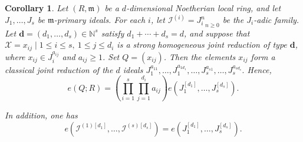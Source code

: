 \documentclass[reqno,12pt]{amsart}
\theoremstyle{plain}
\newtheorem{cor}[prop]{Corollary}
\theoremstyle{definition}
\theoremstyle{remark}
\numberwithin{equation}{section}
\begin{document}
\begin{cor}
\label{cor:weighted-strong-rees-adic}
Let $(R,\mathfrak m)$ be a $d$-dimensional Noetherian local ring, and
let $J_1,\ldots,J_s$ be $\mathfrak m$-primary ideals. For each $i$, let
$\mathcal I^{(i)}={J_i^n}_{n\geq0}$ be the $J_i$-adic family. Let $\mathbf d=(d_1,\ldots,d_s)\in\mathbb N^s$ satisfy
$d_1+\cdots+d_s=d$, and suppose that
$\mathcal X={x_{ij}\mid 1\leq i\leq s,\ 1\leq j\leq d_i}$ is a
strong homogeneous joint reduction of type $\mathbf d$, where
$x_{ij}\in J_i^{a_{ij}}$ and $a_{ij}\geq1$. Set $Q=(x_{ij})$. Then the elements $x_{ij}$ form a classical joint reduction of the
$d$ ideals $
J_1^{a_{11}},\ldots,J_1^{a_{1d_1}},
\ldots,
J_s^{a_{s1}},\ldots,J_s^{a_{sd_s}}.
$ Hence,
\[
e(Q;R)
=
\left(\prod_{i=1}^{s}\prod_{j=1}^{d_i}a_{ij}\right)
e\!\left(J_1^{[d_1]},\ldots,J_s^{[d_s]}\right).
\]

In addition, one has
$$
e\!\left(
\mathcal I^{(1)[d_1]},\ldots,\mathcal I^{(s)[d_s]}
\right)
=
e\!\left(J_1^{[d_1]},\ldots,J_s^{[d_s]}\right).
$$
\end{cor}
\end{document}
